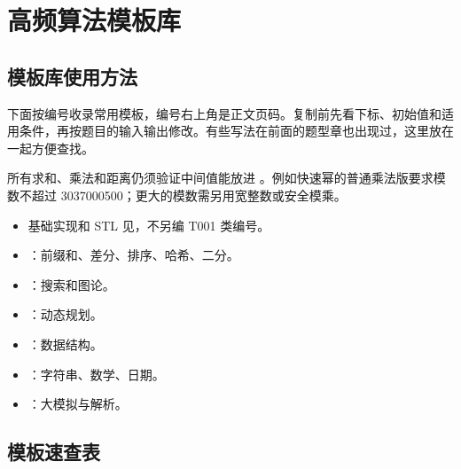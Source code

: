 \chapter{高频算法模板库}\label{ch:09}

\section{模板库使用方法}\label{sec:09-1}

下面按编号收录常用模板，编号右上角是正文页码。复制前先看下标、初始值和适用条件，再按题目的输入输出修改。有些写法在前面的题型章也出现过，这里放在一起方便查找。

所有求和、乘法和距离仍须验证中间值能放进 。例如快速幂的普通乘法版要求模数不超过 3037000500；更大的模数需另用宽整数或安全模乘。

\begin{itemize}
  \item 基础实现和 STL 见，不另编 T001 类编号。
  \item {}：前缀和、差分、排序、哈希、二分。
  \item {}：搜索和图论。
  \item {}：动态规划。
  \item {}：数据结构。
  \item {}：字符串、数学、日期。
  \item {}：大模拟与解析。
\end{itemize}

\section{模板速查表}\label{sec:09-2}\label{sec:template-map}

